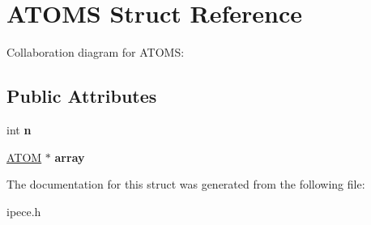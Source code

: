 \hypertarget{struct_a_t_o_m_s}{\section{A\-T\-O\-M\-S Struct Reference}
\label{struct_a_t_o_m_s}
}


Collaboration diagram for A\-T\-O\-M\-S\-:
\subsection*{Public Attributes}
\begin{DoxyCompactItemize}
\item 
\hypertarget{struct_a_t_o_m_s_af7bb983f0c2ef63045876be4ad7af8b5}{int {\bfseries n}}\label{struct_a_t_o_m_s_af7bb983f0c2ef63045876be4ad7af8b5}

\item 
\hypertarget{struct_a_t_o_m_s_a2ad451eeaa67fc24bc04ceb7721c8b4d}{\hyperlink{struct_a_t_o_m}{A\-T\-O\-M} $\ast$ {\bfseries array}}\label{struct_a_t_o_m_s_a2ad451eeaa67fc24bc04ceb7721c8b4d}

\end{DoxyCompactItemize}


The documentation for this struct was generated from the following file\-:\begin{DoxyCompactItemize}
\item 
ipece.\-h\end{DoxyCompactItemize}
